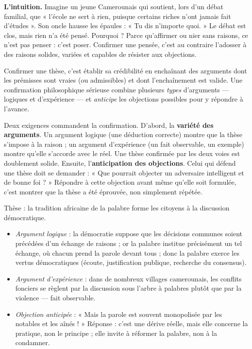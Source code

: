 \documentclass[11pt]{article}
\newcommand{\cle}[1]{{\popxbold\color{popdark}#1}}
\newcounter{popsec}
\newcounter{popsub}
\newcommand{\courssub}[1]{%
  \stepcounter{popsub}%
  \par\vspace{9pt}\noindent{\popxbold\fontsize{11.5}{13}\selectfont\color{popink}{\color{poporange}\thepopsec.\thepopsub}\hspace{6pt}#1}\par\nopagebreak\vspace{4pt}
}
\begin{document}
\courssub{Confirmer une pensée : construire et anticiper}

\textbf{L'intuition.} Imagine un jeune Camerounais qui soutient, lors d'un débat familial, que « l'école ne sert à rien, puisque certains riches n'ont jamais fait d'études ». Son oncle hausse les épaules : « Tu dis n'importe quoi. » Le débat est clos, mais rien n'a été pensé. Pourquoi ? Parce qu'affirmer ou nier sans raisons, ce n'est pas penser : c'est poser. \cle{Confirmer} une pensée, c'est au contraire l'adosser à des raisons solides, variées et capables de résister aux objections.

\begin{definition}[Confirmer]
\cle{Confirmer} une thèse, c'est établir sa crédibilité en enchaînant des \cle{arguments} dont les prémisses sont vraies (ou admissibles) et dont l'enchaînement est valide. Une confirmation philosophique sérieuse combine plusieurs \emph{types} d'arguments — logiques et d'expérience — et \emph{anticipe} les objections possibles pour y répondre à l'avance.
\end{definition}

Deux exigences commandent la confirmation. D'abord, la \textbf{variété des arguments}. Un argument logique (une déduction correcte) montre que la thèse s'impose à la raison ; un argument d'expérience (un fait observable, un exemple) montre qu'elle s'accorde avec le réel. Une thèse confirmée par les deux voies est doublement solide. Ensuite, l'\textbf{anticipation des objections}. Celui qui défend une thèse doit se demander : « Que pourrait objecter un adversaire intelligent et de bonne foi ? » Répondre à cette objection avant même qu'elle soit formulée, c'est montrer que la thèse a été éprouvée, non simplement répétée.

\begin{exemplebox}
Thèse : la tradition africaine de la palabre forme les citoyens à la discussion démocratique.
\begin{itemize}
\item \emph{Argument logique} : la démocratie suppose que les décisions communes soient précédées d'un échange de raisons ; or la palabre institue précisément un tel échange, où chacun prend la parole devant tous ; donc la palabre exerce les vertus démocratiques (écoute, justification publique, recherche du consensus).
\item \emph{Argument d'expérience} : dans de nombreux villages camerounais, les conflits fonciers se règlent par la discussion sous l'arbre à palabres plutôt que par la violence — fait observable.
\item \emph{Objection anticipée} : « Mais la parole est souvent monopolisée par les notables et les aînés ! » Réponse : c'est une dérive réelle, mais elle concerne la pratique, non le principe ; elle invite à réformer la palabre, non à la condamner.
\end{itemize}
\end{exemplebox}
\end{document}
